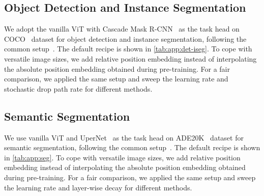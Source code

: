 \documentclass[10pt,twocolumn,letterpaper]{article}
\begin{document}
\subsection{Object Detection and Instance Segmentation}
\label{ap:det}
We adopt the vanilla ViT with Cascade Mask R-CNN~\cite{cai2019cascade} as the task head on COCO~\cite{coco} dataset for object detection and instance segmentation, following the common setup~\cite{zhou2021ibot}.
The default recipe is shown in \cref{tab:app:det-iseg}. To cope with versatile image sizes, we add relative position embedding instead of interpolating the absolute position embedding obtained during pre-training.
For a fair comparison, we applied the same setup and sweep the learning rate and stochastic drop path rate for different methods.

\subsection{Semantic Segmentation}
\label{ap:seg}
We use vanilla ViT and UperNet~\cite{xiao2018unified} as the task head on ADE20K~\cite{ade} dataset for semantic segmentation, following the common setup~\cite{beit}.
The default recipe is shown in \cref{tab:app:seg}. To cope with versatile image sizes, we add relative position embedding instead of interpolating the absolute position embedding obtained during pre-training.
For a fair comparison, we applied the same setup and sweep the learning rate and layer-wise decay for different methods.
\end{document}
